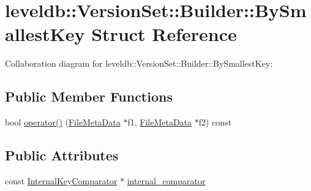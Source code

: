 \hypertarget{structleveldb_1_1_version_set_1_1_builder_1_1_by_smallest_key}{\section{leveldb\-:\-:Version\-Set\-:\-:Builder\-:\-:By\-Smallest\-Key Struct Reference}
\label{structleveldb_1_1_version_set_1_1_builder_1_1_by_smallest_key}
}


Collaboration diagram for leveldb\-:\-:Version\-Set\-:\-:Builder\-:\-:By\-Smallest\-Key\-:
\subsection*{Public Member Functions}
\begin{DoxyCompactItemize}
\item 
bool \hyperlink{structleveldb_1_1_version_set_1_1_builder_1_1_by_smallest_key_ad3a45d378ebdf0c16d26a881c4435344}{operator()} (\hyperlink{structleveldb_1_1_file_meta_data}{File\-Meta\-Data} $\ast$f1, \hyperlink{structleveldb_1_1_file_meta_data}{File\-Meta\-Data} $\ast$f2) const 
\end{DoxyCompactItemize}
\subsection*{Public Attributes}
\begin{DoxyCompactItemize}
\item 
const \hyperlink{classleveldb_1_1_internal_key_comparator}{Internal\-Key\-Comparator} $\ast$ \hyperlink{structleveldb_1_1_version_set_1_1_builder_1_1_by_smallest_key_ac32b5858a81ad3f2c75faf836aac5abe}{internal\-\_\-comparator}
\end{DoxyCompactItemize}


